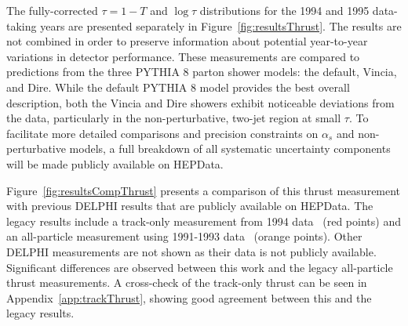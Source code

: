 \documentclass[a4paper,11pt]{article}
\begin{document}
The fully-corrected \(\tau = 1-T\) and \(\log\tau\) distributions for the 1994 and 1995 data-taking years are presented separately in Figure~\ref{fig:resultsThrust}. The results are not combined in order to preserve information about potential year-to-year variations in detector performance. These measurements are compared to predictions from the three PYTHIA 8 parton shower models: the default, Vincia, and Dire. While the default PYTHIA 8 model provides the best overall description, both the Vincia and Dire showers exhibit noticeable deviations from the data, particularly in the non-perturbative, two-jet region at small \(\tau\). To facilitate more detailed comparisons and precision constraints on \(\alpha_s\) and non-perturbative models, a full breakdown of all systematic uncertainty components will be made publicly available on HEPData.

Figure~\ref{fig:resultsCompThrust} presents a comparison of this thrust measurement with previous DELPHI results that are publicly available on HEPData. The legacy results include a track-only measurement from 1994 data~\cite{DELPHI:2000uri} (red points) and an all-particle measurement using 1991-1993 data~\cite{DELPHI:1996sen} (orange points). Other DELPHI measurements are not shown as their data is not publicly available. Significant differences are observed between this work and the legacy all-particle thrust measurements. A cross-check of the track-only thrust can be seen in Appendix~\ref{app:trackThrust}, showing good agreement between this and the legacy results. 
\end{document}
